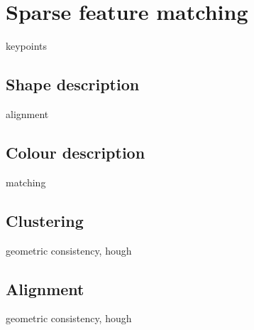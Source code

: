 
\chapter{Sparse feature matching}
\label{cha:feature}

keypoints


\section{Shape description} %
\label{sec:shape} %

alignment


\section{Colour description} %
\label{sec:colour} %

matching


\section{Clustering}
\label{sec:clustering}

geometric consistency, hough


\section{Alignment}
\label{sec:alignment}

geometric consistency, hough

